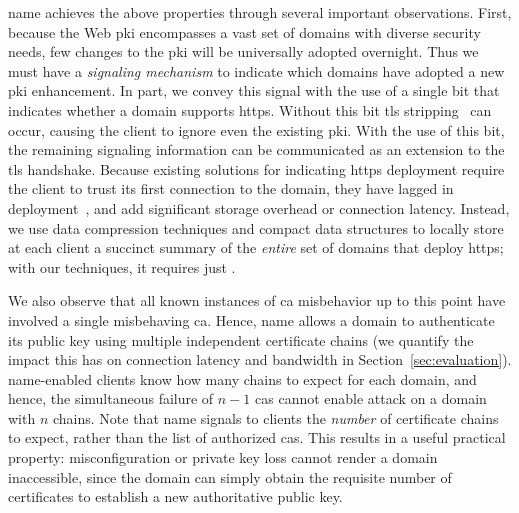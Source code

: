 \ac{name} achieves the above properties through several important observations.
First, because the Web \ac{pki} encompasses a vast set of domains with diverse
security needs, few changes to the \ac{pki} will be universally adopted
overnight. Thus we must have a \emph{signaling mechanism} to indicate which
domains have adopted a new \ac{pki} enhancement. In part, we convey this signal
with the use of a single bit that indicates whether a domain supports
\ac{https}. Without this bit \ac{tls} stripping~\cite{marlinspike2009new} can
occur, causing the client to ignore even the existing \ac{pki}. With the use of
this bit, the remaining signaling information can be communicated as an
extension to the \ac{tls} handshake. Because existing solutions for indicating
\ac{https} deployment require the client to trust its first connection to the
domain, they have lagged in deployment~\cite{rfc4033, rfc6698}, and add
significant storage overhead
or connection
latency. Instead, we
use data compression techniques and compact data structures to locally store at
each client a succinct summary of the \emph{entire} set of domains that deploy
\ac{https}; with our techniques, it requires just .

We also observe that all known instances of \ac{ca} misbehavior up to this point
have involved a single misbehaving \ac{ca}.  Hence, \ac{name} allows a domain to
authenticate its public key using multiple independent certificate chains (we
quantify the impact this has on connection latency and bandwidth in
Section~\ref{sec:evaluation}). \ac{name}-enabled clients know how many chains to
expect for each domain, and hence, the simultaneous failure of $n-1$ \acp{ca}
cannot enable  attack on a domain with $n$ chains. Note that \ac{name}
signals to clients the \emph{number} of certificate chains to expect, rather
than the list of authorized \acp{ca}.  This results in a useful practical
property: misconfiguration or private key loss cannot render a domain
inaccessible, since the domain can simply obtain the requisite number of
certificates to establish a new authoritative public key.


